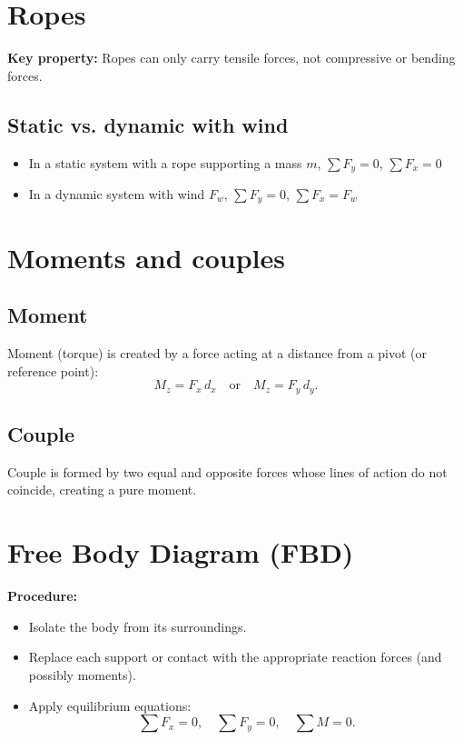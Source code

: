 \documentclass{article}
\begin{document}
\section{Ropes}
\textbf{Key property:} Ropes can only carry tensile forces, not compressive or bending forces.

\subsection{Static vs. dynamic with wind}
\begin{itemize}
    \item In a static system with a rope supporting a mass $m$, $\sum F_y = 0$, $\sum F_x = 0$
    \item In a dynamic system with wind $F_w$, $\sum F_y = 0$, $\sum F_x = F_w$
\end{itemize}

\section{Moments and couples}
\subsection{Moment}
Moment (torque) is created by a force acting at a distance from a pivot (or reference point):
\[
M_z = F_x \, d_x \quad \text{or} \quad M_z = F_y \, d_y.
\]

\subsection{Couple}
Couple is formed by two equal and opposite forces whose lines of action do not coincide, creating a pure moment.

\begin{center}
\end{center}

\section{Free Body Diagram (FBD)}
\textbf{Procedure:}
\begin{itemize}
\item Isolate the body from its surroundings.
\item Replace each support or contact with the appropriate reaction forces (and possibly moments).
\item Apply equilibrium equations:
  \[
  \sum F_x = 0, 
  \quad
  \sum F_y = 0, 
  \quad
  \sum M = 0.
  \]
\end{itemize}
\end{document}

